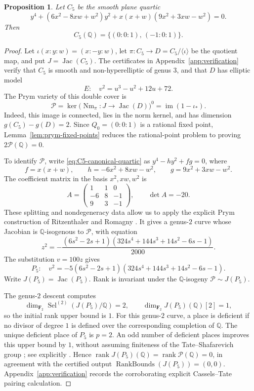 \documentclass[11pt,a4paper]{amsart}
\newtheorem{proposition}[theorem]{Proposition}
\theoremstyle{definition}
\theoremstyle{remark}
\numberwithin{equation}{section}
\newcommand{\Q}{\mathbb{Q}}
\newcommand{\rank}{\operatorname{rank}}
\begin{document}
\begin{proposition}\label{prop:C5-rational-points}
Let \(C_5\) be the smooth plane quartic
\begin{equation}\label{eq:C5-canonical-quartic}
y^4+(6x^2-8xw+w^2)y^2+x(x+w)(9x^2+3xw-w^2)=0.
\end{equation}
Then
\[
C_5(\Q)=\{(0:0:1),\,(-1:0:1)\}.
\]
\end{proposition}

\begin{proof}
Let \(\iota(x:y:w)=(x:-y:w)\), let
\(\pi:C_5\to D=C_5/\langle\iota\rangle\) be the quotient map, and put
\(J=\operatorname{Jac}(C_5)\). The certificates in
Appendix~\ref{app:verification} verify that \(C_5\) is smooth and
non-hyperelliptic of genus \(3\), and that \(D\) has elliptic model
\[
E:\quad v^2=u^3-u^2+12u+72.
\]
The Prym variety of this double cover is
\[
\mathcal P=\ker\!\bigl(\operatorname{Nm}_\pi:J\to
\operatorname{Jac}(D)\bigr)^0
=\operatorname{im}(1-\iota_*).
\]
Indeed, this image is connected, lies in the norm kernel, and has
dimension \(g(C_5)-g(D)=2\). Since \(Q_0=(0:0:1)\) is a rational
fixed point, Lemma~\ref{lem:prym-fixed-points} reduces the rational-point
problem to proving \(2\mathcal P(\Q)=0\).

To identify \(\mathcal P\), write \eqref{eq:C5-canonical-quartic} as
\(y^4-hy^2+fg=0\), where
\[
f=x(x+w),\qquad h=-6x^2+8xw-w^2,\qquad
 g=9x^2+3xw-w^2.
\]
The coefficient matrix in the basis \(x^2,xw,w^2\) is
\[
A=\begin{pmatrix}1&1&0\\-6&8&-1\\9&3&-1\end{pmatrix},
\qquad \det A=-20.
\]
These splitting and nondegeneracy data allow us to apply the explicit
Prym construction of Ritzenthaler and Romagny
\cite[Theorem~1.1]{ritzenthaler2018prym}. It gives a genus-\(2\) curve
whose Jacobian is \(\Q\)-isogenous to \(\mathcal P\), with equation
\[
z^2=-\frac{(6s^2-2s+1)(324s^4+144s^3+14s^2-6s-1)}{2000}.
\]
The substitution \(v=100z\) gives
\begin{equation}\label{eq:P5-prym-curve}
P_5:\quad
v^2=-5(6s^2-2s+1)(324s^4+144s^3+14s^2-6s-1).
\end{equation}
Write \(J(P_5)=\operatorname{Jac}(P_5)\). Rank is invariant under the
\(\Q\)-isogeny \(\mathcal P\sim J(P_5)\).

The genus-\(2\) descent \cite{stoll2001descent} computes
\[
\dim_{\mathbf F_2}\operatorname{Sel}^{(2)}(J(P_5)/\Q)=2,
\qquad \dim_{\mathbf F_2}J(P_5)(\Q)[2]=1,
\]
so the initial rank upper bound is \(1\). For this genus-\(2\) curve,
a place is deficient if no divisor of degree \(1\) is defined over the
corresponding completion of \(\Q\). The unique deficient place of
\(P_5\) is \(p=2\). An odd number of deficient places improves this
upper bound by \(1\), without assuming finiteness of the
Tate--Shafarevich group
\cite[Theorem~5 and Corollary~12]{poonenStollCasselsTate}; see explicitly
\cite[Section~3, Lemma~3.1]{fisherYanCasselsTate}. Hence
\(\rank J(P_5)(\Q)=\rank\mathcal P(\Q)=0\), in agreement with the
certified output \(\operatorname{RankBounds}(J(P_5))=(0,0)\).
Appendix~\ref{app:verification} records the corroborating explicit
Cassels--Tate pairing calculation.


\end{proof}
\end{document}
